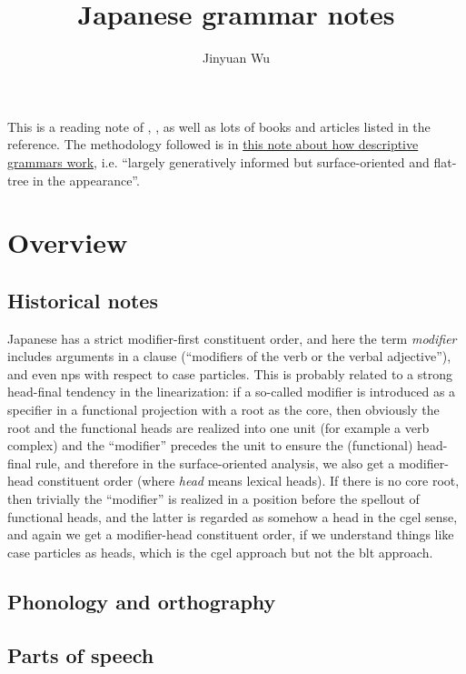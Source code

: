 \documentclass[UTF8, a4paper, oneside, scheme=plain]{ctexart}
\title{Japanese grammar notes}
\author{Jinyuan Wu}
\newcommand*{\term}[1]{\emph{#1}}
\newcommand{\method}{\href{../methodology/glossing.pdf}{this note about how descriptive grammars work}}
\begin{document}
\maketitle

\automath

This is a reading note of \citet{akiyama2012japanese}, \citet{tsutsui1989dictionary},
as well as lots of books and articles listed in the reference.
The methodology followed is in \method,
i.e. ``largely generatively informed but surface-oriented and flat-tree in the appearance''.

\section{Overview}

\subsection{Historical notes}

Japanese has a strict modifier-first constituent order,
and here the term \term{modifier} includes 
arguments in a clause (``modifiers of the verb or the verbal adjective''),
and even \acs{np}s with respect to case particles.
This is probably related to a strong head-final tendency in the linearization:
if a so-called modifier is introduced as a specifier 
in a functional projection with a root as the core,
then obviously the root and the functional heads are realized into one unit (for example a verb complex) 
and the ``modifier'' precedes the unit to ensure the (functional) head-final rule,
and therefore in the surface-oriented analysis,
we also get a modifier-head constituent order (where \term{head} means lexical heads).
If there is no core root,
then trivially the ``modifier'' is realized in a position before the spellout of functional heads,
and the latter is regarded as somehow a head in the \acs{cgel} sense,
and again we get a modifier-head constituent order,
if we understand things like case particles as heads,
which is the \ac{cgel} approach but not the \acs{blt} approach.

\subsection{Phonology and orthography}

\subsection{Parts of speech}
\end{document}
